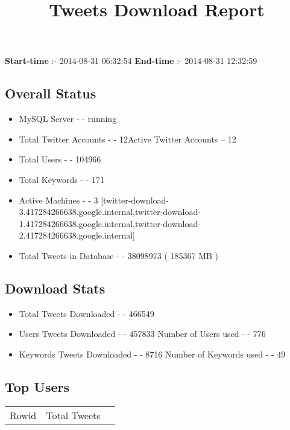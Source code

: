 \documentclass{article}\usepackage[T1]{fontenc}
\begin{document}
\title{\textbf{Tweets Download Report}}
               \date{}
                \maketitle
               \centerline{\textbf{Start-time} :- 2014-08-31 06:32:54 \hspace{40pt} \textbf{End-time} :- 2014-08-31 12:32:59}               \subsection*{Overall Status}                \begin{itemize}                \item MySQL Server - - running               \item Total Twitter Accounts - - 12\newline Active Twitter Accounts -- 12               \item Total Users - - 104966               \item Total Keywords - - 171               \item Active Machines - - 3 [twitter-download-3.417284266638.google.internal,twitter-download-1.417284266638.google.internal,twitter-download-2.417284266638.google.internal]               \item Total Tweets in Database - - 38098973 ( 185367 MB )               \end{itemize}               \subsection*{Download Stats}                \begin{itemize}                \item Total Tweets Downloaded - - 466549               \item Users Tweets Downloaded - - 457833 \newline Number of Users used - - 776               \item Keywords Tweets Downloaded - - 8716 \newline Number of Keywords used - - 49              \end{itemize}              \subsection*{Top Users}\begin{tabular}{|c|c|c|}         \hline         Rowid & Total Tweets \\ 

\end{tabular}
\end{document}
